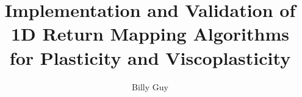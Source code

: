 \documentclass[final,5p,times,twocolumn]{elsarticle}
\begin{document}
\begin{frontmatter}



\title{Implementation and Validation of 1D Return Mapping 
Algorithms for Plasticity and Viscoplasticity}


\author{Billy Guy} %


\begin{abstract}


\end{abstract}
\end{frontmatter}
\end{document}
